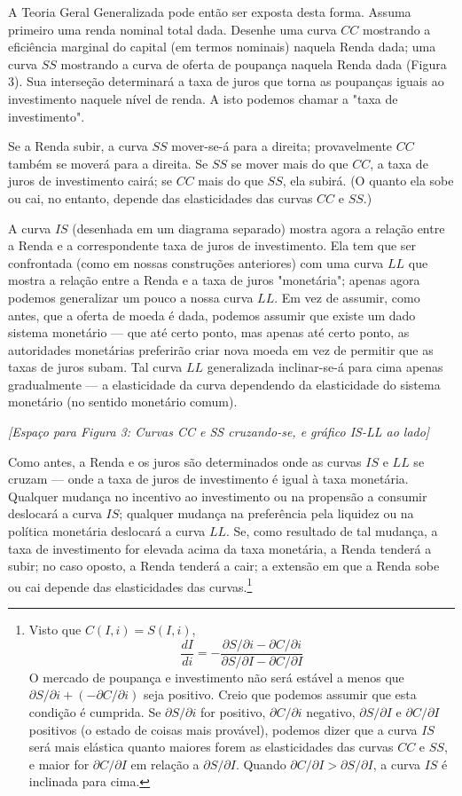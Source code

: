 \documentclass[12pt]{article}
\begin{document}
A Teoria Geral Generalizada pode então ser exposta desta forma. Assuma primeiro uma renda nominal total dada. Desenhe uma curva $CC$ mostrando a eficiência marginal do capital (em termos nominais) naquela Renda dada; uma curva $SS$ mostrando a curva de oferta de poupança naquela Renda dada (Figura 3). Sua interseção determinará a taxa de juros que torna as poupanças iguais ao investimento naquele nível de renda. A isto podemos chamar a "taxa de investimento".

Se a Renda subir, a curva $SS$ mover-se-á para a direita; provavelmente $CC$ também se moverá para a direita. Se $SS$ se mover mais do que $CC$, a taxa de juros de investimento cairá; se $CC$ mais do que $SS$, ela subirá. (O quanto ela sobe ou cai, no entanto, depende das elasticidades das curvas $CC$ e $SS$.)

A curva $IS$ (desenhada em um diagrama separado) mostra agora a relação entre a Renda e a correspondente taxa de juros de investimento. Ela tem que ser confrontada (como em nossas construções anteriores) com uma curva $LL$ que mostra a relação entre a Renda e a taxa de juros "monetária"; apenas agora podemos generalizar um pouco a nossa curva $LL$. Em vez de assumir, como antes, que a oferta de moeda é dada, podemos assumir que existe um dado sistema monetário — que até certo ponto, mas apenas até certo ponto, as autoridades monetárias preferirão criar nova moeda em vez de permitir que as taxas de juros subam. Tal curva $LL$ generalizada inclinar-se-á para cima apenas gradualmente — a elasticidade da curva dependendo da elasticidade do sistema monetário (no sentido monetário comum).

\begin{center}
\textit{[Espaço para Figura 3: Curvas CC e SS cruzando-se, e gráfico IS-LL ao lado]}
\end{center}

Como antes, a Renda e os juros são determinados onde as curvas $IS$ e $LL$ se cruzam — onde a taxa de juros de investimento é igual à taxa monetária. Qualquer mudança no incentivo ao investimento ou na propensão a consumir deslocará a curva $IS$; qualquer mudança na preferência pela liquidez ou na política monetária deslocará a curva $LL$. Se, como resultado de tal mudança, a taxa de investimento for elevada acima da taxa monetária, a Renda tenderá a subir; no caso oposto, a Renda tenderá a cair; a extensão em que a Renda sobe ou cai depende das elasticidades das curvas.\footnote{Visto que $C(I, i) = S(I, i)$,
\[ \frac{dI}{di} = - \frac{\partial S / \partial i - \partial C / \partial i}{\partial S / \partial I - \partial C / \partial I} \]
O mercado de poupança e investimento não será estável a menos que $\partial S / \partial i + (- \partial C / \partial i)$ seja positivo. Creio que podemos assumir que esta condição é cumprida. Se $\partial S / \partial i$ for positivo, $\partial C / \partial i$ negativo, $\partial S / \partial I$ e $\partial C / \partial I$ positivos (o estado de coisas mais provável), podemos dizer que a curva $IS$ será mais elástica quanto maiores forem as elasticidades das curvas $CC$ e $SS$, e maior for $\partial C / \partial I$ em relação a $\partial S / \partial I$. Quando $\partial C / \partial I > \partial S / \partial I$, a curva $IS$ é inclinada para cima.}
\end{document}
